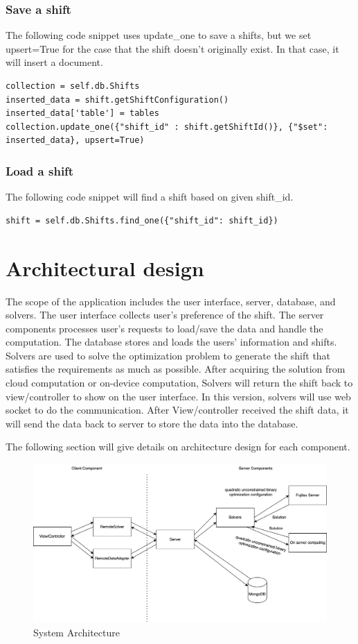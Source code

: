 \documentclass[11pt, oneside]{article}   	%
\begin{document}
\subsubsection{Save a shift}
The following code snippet uses update\_one to save a shifts, but we set upsert=True for the case that the shift doesn't originally exist. In that case, it will insert a document.
\begin{verbatim}
collection = self.db.Shifts
inserted_data = shift.getShiftConfiguration() 
inserted_data['table'] = tables
collection.update_one({"shift_id" : shift.getShiftId()}, {"$set": inserted_data}, upsert=True)
\end{verbatim}

\subsubsection{Load a shift}
The following code snippet will find a shift based on given shift\_id.
\begin{verbatim}
shift = self.db.Shifts.find_one({"shift_id": shift_id})
\end{verbatim}

\section{Architectural design}
The scope of the application includes the user interface, server, database, and solvers. The user interface collects user's preference of the shift. The server components processes user's requests to load/save the data and handle the computation. The database stores and loads the users' information and shifts. Solvers are used to solve the optimization problem to generate the shift that satisfies the requirements as much as possible. After acquiring the solution from cloud computation or on-device computation, Solvers will return the shift back to view/controller to show on the user interface. In this version, solvers will use web socket to do the communication. After View/controller received the shift data, it will send the data back to server to store the data into the database. 

The following section will give details on architecture design for each component.

\begin{figure}[h]
\centering
\includegraphics[width=\textwidth]{arch1}
\caption{System Architecture}
\label{sysarch}
\end{figure}
\end{document}
